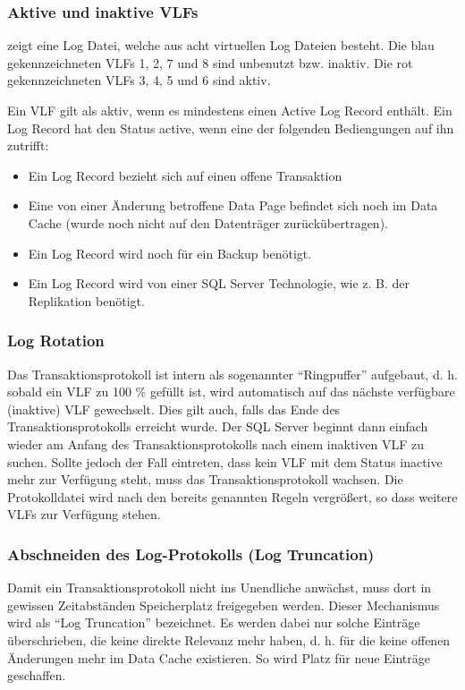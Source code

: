         \subsubsection{Aktive und inaktive VLFs}
           zeigt eine Log Datei, welche aus acht
          virtuellen Log Dateien besteht. Die blau gekennzeichneten VLFs 1, 2, 7
          und 8 sind unbenutzt bzw. inaktiv. Die rot gekennzeichneten VLFs 3, 4,
          5 und 6 sind aktiv.
          
          Ein VLF gilt als aktiv, wenn es mindestens einen Active Log Record
          enthält. Ein Log Record hat den Status active, wenn eine der folgenden
          Bediengungen auf ihn zutrifft:
\clearpage
          \begin{itemize}
              \item Ein Log Record bezieht sich auf einen offene Transaktion
              \item Eine von einer Änderung betroffene Data Page befindet sich
              noch im Data Cache (wurde noch nicht auf den Datenträger
              zurückübertragen).
              \item Ein Log Record wird noch für ein Backup benötigt.
              \item Ein Log Record wird von einer SQL Server Technologie, wie z.
              B. der Replikation benötigt.
          \end{itemize}
        \subsubsection{Log Rotation}
          Das Transaktionsprotokoll ist intern als sogenannter
          \enquote{Ringpuffer} aufgebaut, d. h. sobald ein VLF zu 100 \% gefüllt
          ist, wird automatisch auf das nächste verfügbare (inaktive) VLF
          gewechselt. Dies gilt auch, falls das Ende des Transaktionsprotokolls
          erreicht wurde. Der SQL Server beginnt dann einfach wieder am Anfang
          des Transaktionsprotokolls nach einem inaktiven VLF zu suchen.
          Sollte jedoch der Fall eintreten, dass kein VLF mit dem Status
          inactive mehr zur Verfügung steht, muss das Transaktionsprotokoll
          wachsen. Die Protokolldatei wird nach den bereits genannten Regeln
          vergrößert, so dass weitere VLFs zur Verfügung stehen.
        \subsubsection{Abschneiden des Log-Protokolls (Log Truncation)}
          Damit ein Transaktionsprotokoll nicht ins Unendliche anwächst, muss
          dort in gewissen Zeitabständen Speicherplatz freigegeben werden.
          Dieser Mechanismus wird als \enquote{Log Truncation} bezeichnet. Es
          werden dabei nur solche Einträge überschrieben, die keine
          direkte Relevanz mehr haben, d. h. für die keine offenen Änderungen
          mehr im Data Cache existieren. So wird Platz für neue Einträge
          geschaffen.
          

